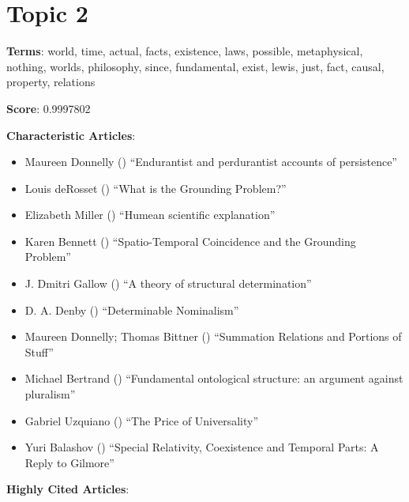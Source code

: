 \documentclass[
  10pt,
  letterpaper,
  DIV=11,
  numbers=noendperiod,
  twoside]{scrartcl}
\providecommand{\tightlist}{%
  \setlength{\itemsep}{0pt}\setlength{\parskip}{0pt}}\usepackage{longtable,booktabs,array}
\begin{document}
\section{Topic 2}\label{topic-2}

\textbf{Terms}: world, time, actual, facts, existence, laws, possible,
metaphysical, nothing, worlds, philosophy, since, fundamental, exist,
lewis, just, fact, causal, property, relations

\textbf{Score}: 0.9997802

\textbf{Characteristic Articles}:

\begin{itemize}
\tightlist
\item
  Maureen Donnelly ()
  ``Endurantist and perdurantist accounts of persistence''
\item
  Louis deRosset () ``What is the
  Grounding Problem?''
\item
  Elizabeth Miller () ``Humean
  scientific explanation''
\item
  Karen Bennett ()
  ``Spatio-Temporal Coincidence and the Grounding Problem''
\item
  J. Dmitri Gallow () ``A theory
  of structural determination''
\item
  D. A. Denby () ``Determinable
  Nominalism''
\item
  Maureen Donnelly; Thomas Bittner
  () ``Summation Relations and
  Portions of Stuff''
\item
  Michael Bertrand ()
  ``Fundamental ontological structure: an argument against pluralism''
\item
  Gabriel Uzquiano () ``The Price
  of Universality''
\item
  Yuri Balashov () ``Special
  Relativity, Coexistence and Temporal Parts: A Reply to Gilmore''
\end{itemize}

\textbf{Highly Cited Articles}:
\end{document}
